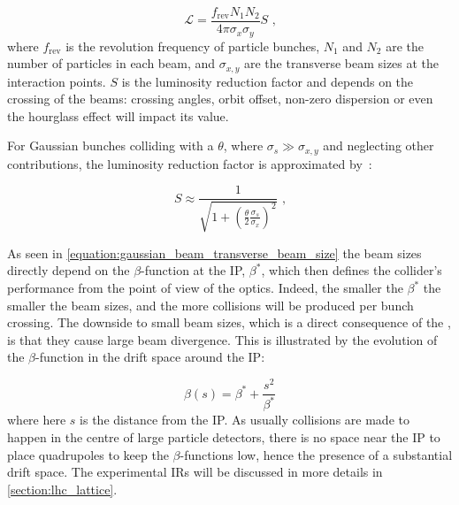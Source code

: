 \begin{equation}
    \mathcal{L} = \frac{f_{\mathrm{rev}} N_1 N_2}{4 \pi \sigma_x \sigma_y} S \text{ ,}
    \label{equation:luminosity_gaussian_beams}
\end{equation}
where \(f_{\mathrm{rev}}\) is the revolution frequency of particle bunches, \(N_1\) and \(N_2\) are the number of particles in each beam, and \(\sigma_{x,y}\) are the transverse beam sizes at the interaction points.
\(S\) is the \gls{luminosity} reduction factor and depends on the crossing of the beams: crossing angles, orbit offset, non-zero dispersion or even the hourglass effect will impact its value.

For Gaussian bunches colliding with a  \(\theta\), where \(\sigma_s \gg \sigma_{x,y}\) and neglecting other contributions, the luminosity reduction factor is approximated by~\cite{CERN:Herr:Concept_Luminosity}:

\begin{equation}
    S \approx \frac{1}{\sqrt{1 + \left( \frac{\theta}{2} \frac{\sigma_s}{\sigma_x} \right)^2}} \text{ ,}
    \label{equation:luminosity_reduction_factor}
\end{equation}

As seen in \cref{equation:gaussian_beam_transverse_beam_size} the beam sizes directly depend on the \(\beta\)-function at the \gls{IP}, \(\beta^{\ast}\), which then defines the collider's performance from the point of view of the optics.
Indeed, the smaller the \(\beta^{\ast}\) the smaller the beam sizes, and the more collisions will be produced per bunch crossing. 
The downside to small beam sizes, which is a direct consequence of the , is that they cause large beam divergence.
This is illustrated by the evolution of the \(\beta\)-function in the drift space around the IP:

\begin{equation}
    \beta(s) = \beta^{\ast} + \frac{s^2}{\beta^{\ast}}
    \label{equation:betafunction_drift_space}
\end{equation}
where here \(s\) is the distance from the IP.
As usually collisions are made to happen in the centre of large particle detectors, there is no space near the IP to place quadrupoles to keep the \(\beta\)-functions low, hence the presence of a substantial drift space.
The experimental \glspl{IR} will be discussed in more details in \cref{section:lhc_lattice}.

